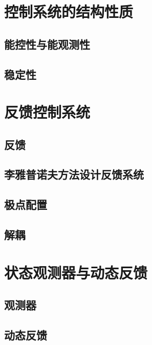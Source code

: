 \documentclass[
12pt, %
a4paper, 
oneside, %
headinclude,footinclude, %
]{scrartcl}
\begin{document}
\section{控制系统的结构性质}
\subsection[能控性与能观测性]{能控性与能观测性}
\subsection[稳定性]{稳定性}
\section{反馈控制系统}
\subsection[反馈]{反馈}
\subsection[李雅普诺夫方法设计反馈系统]{李雅普诺夫方法设计反馈系统}
\subsection[极点配置]{极点配置}
\subsection[解耦]{解耦}
\section{状态观测器与动态反馈}
\subsection[观测器]{观测器}
\subsection[动态反馈]{动态反馈}
\end{document}
